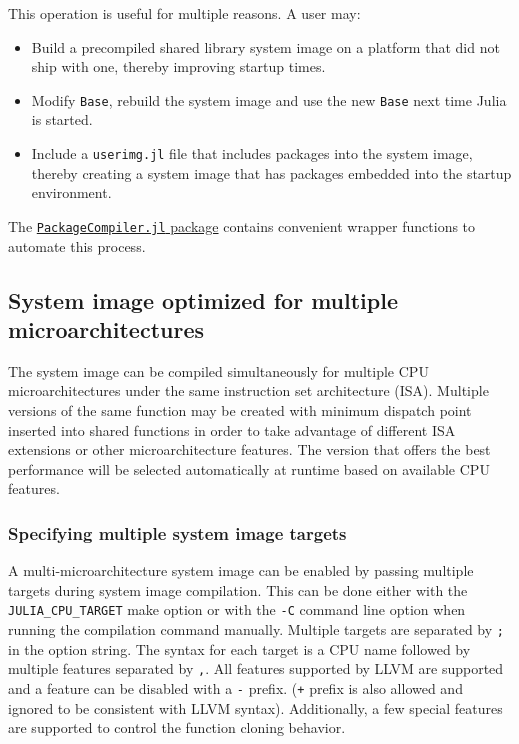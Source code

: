 This operation is useful for multiple reasons.  A user may:



\begin{itemize}
\item Build a precompiled shared library system image on a platform that did not ship with one, thereby improving startup times.


\item Modify \texttt{Base}, rebuild the system image and use the new \texttt{Base} next time Julia is started.


\item Include a \texttt{userimg.jl} file that includes packages into the system image, thereby creating a system image that has packages embedded into the startup environment.

\end{itemize}


The \href{https://github.com/JuliaLang/PackageCompiler.jl}{\texttt{PackageCompiler.jl} package} contains convenient wrapper functions to automate this process.



\hypertarget{6216163822526201376}{}


\subsection{System image optimized for multiple microarchitectures}



The system image can be compiled simultaneously for multiple CPU microarchitectures under the same instruction set architecture (ISA). Multiple versions of the same function may be created with minimum dispatch point inserted into shared functions in order to take advantage of different ISA extensions or other microarchitecture features. The version that offers the best performance will be selected automatically at runtime based on available CPU features.



\hypertarget{7911922725601251657}{}


\subsubsection{Specifying multiple system image targets}



A multi-microarchitecture system image can be enabled by passing multiple targets during system image compilation. This can be done either with the \texttt{JULIA\_CPU\_TARGET} make option or with the \texttt{-C} command line option when running the compilation command manually. Multiple targets are separated by \texttt{;} in the option string. The syntax for each target is a CPU name followed by multiple features separated by \texttt{,}. All features supported by LLVM are supported and a feature can be disabled with a \texttt{-} prefix. (\texttt{+} prefix is also allowed and ignored to be consistent with LLVM syntax). Additionally, a few special features are supported to control the function cloning behavior.



